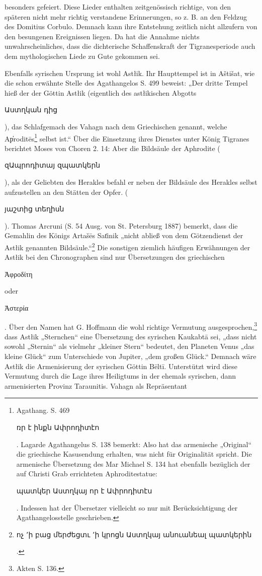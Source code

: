 \documentclass{article}
\begin{document}
besonders gefeiert. Diese Lieder enthalten zeitgenössisch richtige, von den späteren nicht mehr richtig verstandene Erinnerungen, so z. B. an den Feldzug des Domitius Corbulo. Demnach kann ihre Entstehung zeitlich nicht allzufern von den besungenen Ereignissen liegen. Da hat die Annahme nichts unwahrscheinliches, dass die dichterische Schaffenskraft der Tigranesperiode auch dem mythologischen Liede zu Gute gekommen sei.

Ebenfalls syrischen Ursprung ist wohl Astłik. Ihr Haupttempel ist in Aštišat, wie die schon erwähnte Stelle des Agathangelos S. 499 beweist: „Der dritte Tempel hieß der der Göttin Astłik (eigentlich des astłikischen Abgotts \begin{armenian}Աստղկան դից\end{armenian}), das Schlafgemach des Vahagn nach dem Griechischen genannt, welche Ap̔roditēs\footnote{Agathang. S. 469 \begin{armenian}ռր է ինքն Ափրոդիտէո\end{armenian}. Lagarde Agathangelus S. 138 bemerkt: Also hat das armenische „Original“ die griechische Kasusendung erhalten, was nicht für Originalität spricht. Die armenische Übersetzung des Mar Michael S. 134 hat ebenfalls bezüglich der auf Christi Grab errichteten Aphroditestatue: \begin{armenian}պատկեր Աստղկայ որ է Ափրոդիտէս\end{armenian}. Indessen hat der Übersetzer vielleicht so nur mit Berücksichtigung der Agathangelosstelle geschrieben.} selbst ist.“ Über die Einsetzung ihres Dienstes unter König Tigranes berichtet Moses von Choren 2. 14: Aber die Bildsäule der Aphrodite (\begin{armenian}զԱպրոդիտայ զպատկերն\end{armenian}), als der Geliebten des Herakles befahl er neben der Bildsäule des Herakles selbst aufzustellen an den Stätten der Opfer. (\begin{armenian}յաշտից տեղիսն\end{armenian}). Thomas Arcruni (S. 54 Ausg. von St. Petersburg 1887) bemerkt, dass die Gemahlin des Königs Artašēs Sat͑inik „nicht abließ von dem Götzendienst der Astłik genannten Bildsäule.“\footnote{\begin{armenian}ոչ ՚ի բաց մերժեցտւ ՚ի կրոցն Աստղկայ անուանեալ պատկերին\end{armenian}.} Die sonstigen ziemlich häufigen Erwähnungen der Astłik bei den Chronographen sind nur Übersetzungen des griechischen \begin{greek}Ἀφροδίτη\end{greek} oder \begin{greek}Ἀστερία\end{greek}. Über den Namen hat G. Hoffmann die wohl richtige Vermutung ausgesprochen,\footnote{Akten S. 136.} dass Astłik „Sternchen“ eine Übersetzung des syrischen Kaukabtā sei, „dass nicht sowohl „Sternin“ als vielmehr „kleiner Stern“ bedeutet, den Planeten Venus „das kleine Glück“ zum Unterschiede von Jupiter, „dem großen Glück.“ Demnach wäre Astłik die Armenisierung der syrischen Göttin Bēltī. Unterstützt wird diese Vermutung durch die Lage ihres Heiligtums in der ehemals syrischen, dann armenisierten Provinz Taraunitis. Vahagn als Repräsentant 
\end{document}
